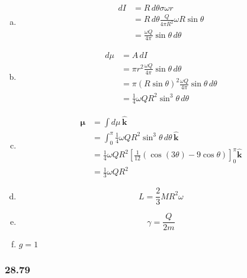 \documentclass{article}
\begin{document}
\begin{enumerate}[(a)]
  \item

        \begin{align*}
          dI & = R \,d\theta \sigma \omega r                          \\
             & = R \,d\theta \frac{Q}{4 \pi R^2} \omega R \sin \theta \\
             & = \frac{\omega Q}{4 \pi} \sin \theta \,d\theta
        \end{align*}

  \item

        \begin{align*}
          d\mu & = A \,dI                                                             \\
               & = \pi r^2 \frac{\omega Q}{4 \pi} \sin \theta \,d\theta               \\
               & = \pi (R \sin \theta)^2 \frac{\omega Q}{4 \pi} \sin \theta \,d\theta \\
               & = \frac{1}{4} \omega Q R^2 \sin^3 \theta \,d\theta
        \end{align*}

  \item

        \begin{align*}
          \boldsymbol{\mu} & = \int d\mu \,\hat{\mathbf{k}}                                                                                  \\
                           & = \int_0^\pi \frac{1}{4} \omega Q R^2 \sin^3 \theta \,d\theta \,\hat{\mathbf{k}}                                \\
                           & = \frac{1}{4} \omega Q R^2 \left[ \frac{1}{12} (\cos (3 \theta) - 9 \cos \theta) \right]_0^\pi \hat{\mathbf{k}} \\
                           & = \frac{1}{3} \omega Q R^2
        \end{align*}

  \item \[L = \frac{2}{3} M R^2 \omega\]

  \item \[\gamma = \frac{Q}{2 m}\]

  \item $g = 1$
\end{enumerate}

\subsubsection{28.79}
\end{document}
